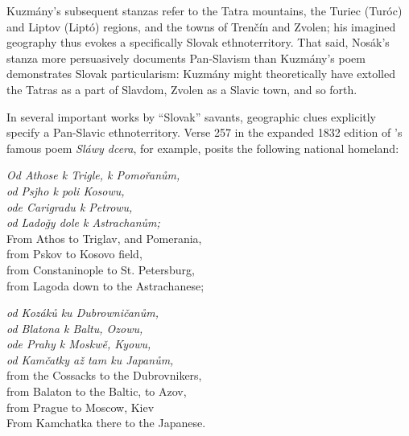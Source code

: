 \noindent {}Kuzmány’s subsequent stanzas refer to the Tatra mountains, the Turiec (Turóc) and Liptov (Liptó) regions, and the towns of Trenčín and Zvolen; his imagined geography thus evokes a specifically Slovak ethnoterritory. That said, Nosák’s stanza more persuasively documents Pan-Slavism than Kuzmány’s poem demonstrates Slovak particularism: Kuzmány might theoretically have extolled the Ta\-tras as a part of Slavdom, Zvolen as a Slavic town, and so forth.

In several important works by “Slovak” savants, geographic clues explicitly specify a Pan-Slavic ethnoterritory. Verse 257 in the expanded 1832 edition of \citeauthor{kollar_slawy_1832}’s famous poem \textit{Sláwy dcera}, for example, posits the following national homeland:

\begin{small}
\begin{multicols}{2}
\noindent \hspace*{5mm} \textit{Od Athose k Trigle, k Pomořanům,} \\
\hspace*{5mm} \textit{od Psjho k poli Kosowu,} \\
\hspace*{5mm} \textit{ode Carigradu k Petrowu,} \\ \columnbreak
\hspace*{5mm} \textit{od Ladoǧy dole k Astrachanům;} \\
From Athos to Triglav, and Pomerania, \\
from Pskov to Kosovo field, \\
from Constaninople to St. Petersburg, \\
from Lagoda down to the Astrachanese; \\

\end{multicols}
\end{small}

\begin{small}
\begin{multicols}{2}
\noindent \hspace*{5mm} \textit{od Kozáků ku Dubrowničanům,} \\
\hspace*{5mm} \textit{od Blatona k Baltu, Ozowu,} \\
\hspace*{5mm} \textit{ode Prahy k Moskwě, Kyowu,} \\ \columnbreak
\hspace*{5mm} \textit{od Kamčatky až tam ku Japanům,} \\
from the Cossacks to the Dubrovnikers, \\
from Balaton to the Baltic, to Azov, \\
from Prague to Moscow, Kiev \\
From Kamchatka there to the Japanese. \smallskip \\
\citep[verse 257 (no page numbers)]{kollar_slawy_1832}
\end{multicols}
\end{small}

